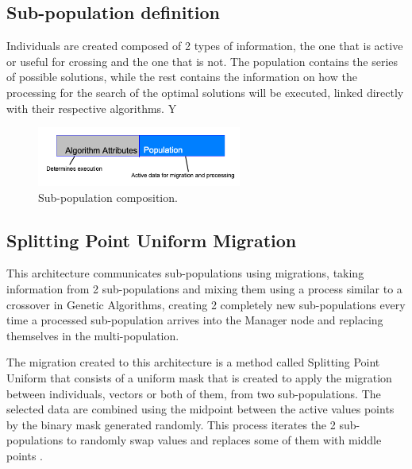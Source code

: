 \documentclass[runningheads]{llncs}
\begin{document}
\subsection{Sub-population definition}

Individuals are created composed of 2 types of information, the one that is
active or useful for crossing and the one that is not. %
The population contains
the series of possible solutions, while the rest %
contains the information on how
the processing for the search of the optimal solutions will be executed, linked
directly with their respective algorithms.
Y
\begin{figure}[htp]
  \centering
  \includegraphics[width=0.6\textwidth]{img/subpopulationDefinition.png}
  \caption{Sub-population composition.} \label{fig3}
  \end{figure}

\subsection{Splitting Point Uniform Migration}

This architecture communicates sub-populations using migrations,
taking
information from 2 sub-populations and mixing them using a process similar to a
crossover in Genetic Algorithms, creating 2 completely new sub-populations every
time a processed sub-population arrives into the Manager node and replacing
themselves in the multi-population.

The migration created to %
this architecture is a method called Splitting Point
Uniform that consists of a uniform mask that is created to apply the migration
between individuals, vectors or both of them, from two sub-populations. The
selected data are combined using the midpoint between the active values
points by the binary mask generated randomly. %
This process iterates the 2
sub-populations to randomly swap values and replaces some of them with middle
points \cite{Kramer2017,Kaya2011}.
\end{document}
